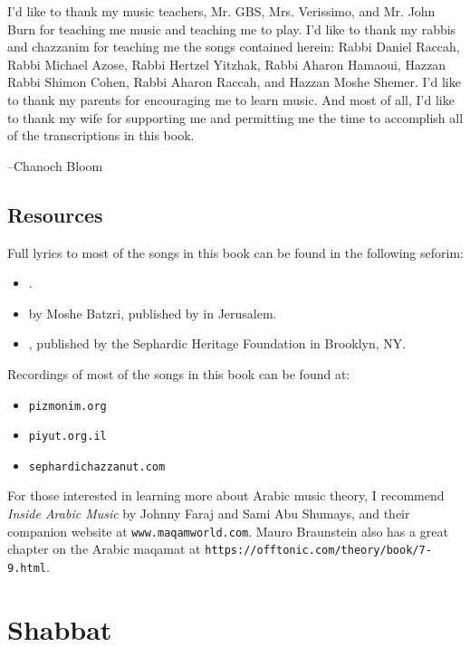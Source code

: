 \documentclass[letterpaper]{memoir}
\newcommand{\song}[2]{}
\begin{document}
I'd like to thank my music teachers, Mr. GBS, Mrs. Verissimo, and Mr. John Burn 
for teaching me music and teaching me to play. I'd like to thank my rabbis and 
chazzanim for teaching me the songs contained herein: Rabbi Daniel Raccah, Rabbi 
Michael Azose, Rabbi Hertzel Yitzhak, Rabbi Aharon Hamaoui, Hazzan Rabbi Shimon 
Cohen, Rabbi Aharon Raccah, and Hazzan Moshe Shemer. I'd like to thank my 
parents for encouraging me to learn music. And most of all, I'd like to thank my 
wife for supporting me and permitting me the time to accomplish all of the 
transcriptions in this book.

--Chanoch Bloom

\section*{Resources}

Full lyrics to most of the songs in this book can be found in the following seforim:

\begin{itemize}
\item {}.
\item {} by Moshe Batzri, published by  in Jerusalem.
\item {}, published by the Sephardic Heritage Foundation in Brooklyn, NY.
\end{itemize}

\noindent
Recordings of most of the songs in this book can be found at:

\begin{itemize}
\item \texttt{pizmonim.org}
\item \texttt{piyut.org.il}
\item \texttt{sephardichazzanut.com}
\end{itemize}

For those interested in learning more about
Arabic music theory, I recommend \textit{Inside Arabic Music} by Johnny 
Faraj and Sami Abu Shumays, and their companion website at \texttt{www.maqamworld.com}.
Mauro Braunstein also has a great chapter on the Arabic maqamat at 
\texttt{https://offtonic.com/theory/book/7-9.html}.




\chapter{Shabbat}
\song{Ashir La'el Asher Shavat}{Ashir_Lael_Asher_Shavat.pdf}
\end{document}
